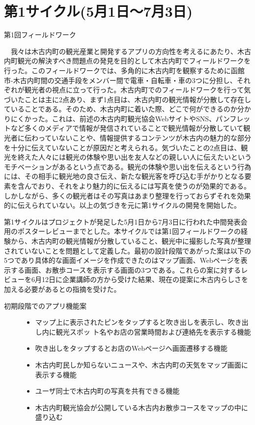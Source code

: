 \section{第1サイクル(5月1日〜7月3日)}

\begin{description}
\item[第1回フィールドワーク]\mbox{}
\end{description}
　我々は木古内町の観光産業と開発するアプリの方向性を考えるにあたり、木古内町観光の解決すべき問題点の発見を目的として木古内町でフィールドワークを行った。このフィールドワークでは、多角的に木古内町を観察するために函館市-木古内町間の交通手段をメンバー間で電車・自転車・車の3つに分担し、それぞれが観光者の視点に立って行った。木古内町でのフィールドワークを行って気づいたことは主に2点あり、まず1点目は、木古内町の観光情報が分散して存在していることである。そのため、木古内町に着いた際、どこで何ができるのか分かりにくかった。これは、前述の木古内町観光協会WebサイトやSNS、パンフレットなど多くのメディアで情報が発信されていることで観光情報が分散していて観光者に伝わっていないことや、情報提供するコンテンツが木古内の魅力的な部分を十分に伝えていないことが原因だと考えられる。気づいたことの2点目は、観光を終えた人々には観光の体験や思い出を友人などの親しい人に伝えたいというモチベーションがあるという点である。観光の体験や思い出を伝えるという行為には、その相手に観光地の良さ伝え、新たな観光客を呼び込む手がかりとなる要素を含んでおり、それをより魅力的に伝えるには写真を使うのが効果的である。しかしながら、多くの観光者はその写真はあまり整理を行っておらずそれを効果的に伝えられていない。以上の気づきを元に第1サイクルの開発を開始した。

第1サイクルはプロジェクトが発足した5月1日から7月3日に行われた中間発表会用のポスターレビューまでとした。本サイクルでは第1回フィールドワークの経験から、木古内町の観光情報が分散していること、観光中に撮影した写真が整理されていないことを問題として定義した。最初の設計段階であがった案は以下の5つであり具体的な画面イメージを作成できたのはマップ画面、Webページを表示する画面、お散歩コースを表示する画面の3つである。これらの案に対するレビューを6月12日に企業講師の方から受けた結果、現在の提案に木古内らしさを加える必要があるとの指摘を受けた。
\begin{description}
\item[初期段階でのアプリ機能案]\mbox{}
\begin{itemize}
 \item マップ上に表示されたピンをタップすると吹き出しを表示し、吹き出し内に観光スポッ ト名やお店の営業時間および連絡先を表示する機能
  \item 吹き出しをタップするとお店のWebページへ画面遷移する機能
 \item 木古内町民しか知らないニュースや、木古内町の天気をマップ画面に表示する機能
 \item ユーザ同士で木古内町の写真を共有できる機能
 \item 木古内町観光協会が公開している木古内お散歩コースをマップの中に盛り込む
\end{itemize}
\end{description}

